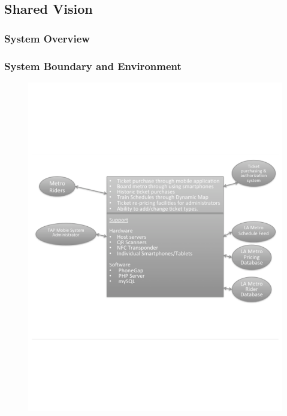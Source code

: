 

\subsection{Shared Vision}

	\subsubsection{System Overview}\begin{multicols}{2}
		
	\end{multicols}
 	\newpage

 	\subsubsection{System Boundary and Environment}
 	\begin{figure}[h]
 		\centering
 		\includegraphics[scale=0.5]{OCD/boundary2.pdf}
 	\end{figure}
 	\newpage
 		
